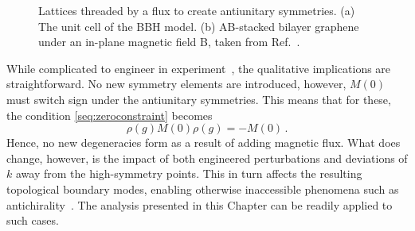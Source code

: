\begin{figure} [h!]
	\centering
	
	\caption{Lattices threaded by a flux to create antiunitary symmetries. (a) The unit cell of the BBH model. (b) AB-stacked bilayer graphene under an in-plane magnetic field B, taken from Ref.~\cite{Denner_2020}.}
	\label{fig:symm_fluxes}
\end{figure}

While complicated to engineer in experiment~\cite{Serra-Garcia_2018}, the qualitative implications are straightforward. No new symmetry elements are introduced, however, $M(0)$ must switch sign under the antiunitary symmetries. This means that for these,  the condition \eqref{seq:zeroconstraint} becomes
\begin{equation}
\rho(g) M(0) \rho(g) = - M(0) \,.
\end{equation} 
Hence, no new degeneracies form as a result of adding magnetic flux. What does change, however, is the impact of both engineered perturbations and deviations of $k$ away from the high-symmetry points. This in turn affects the resulting topological boundary modes, enabling otherwise inaccessible phenomena such as antichirality~\cite{Denner_2020}. The analysis presented in this Chapter can be readily applied to such cases. 